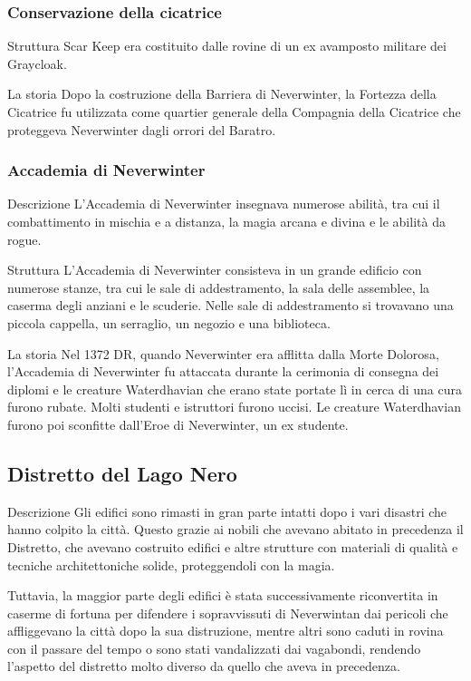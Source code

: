 \documentclass{article}
\begin{document}
              \subsubsection{Conservazione della cicatrice}
Struttura
Scar Keep era costituito dalle rovine di un ex avamposto militare dei Graycloak.

La storia
Dopo la costruzione della Barriera di Neverwinter, la Fortezza della Cicatrice fu utilizzata come quartier generale della Compagnia della Cicatrice che proteggeva Neverwinter dagli orrori del Baratro.
              \subsubsection{Accademia di Neverwinter}
Descrizione
L'Accademia di Neverwinter insegnava numerose abilità, tra cui il combattimento in mischia e a distanza, la magia arcana e divina e le abilità da rogue.

Struttura
L'Accademia di Neverwinter consisteva in un grande edificio con numerose stanze, tra cui le sale di addestramento, la sala delle assemblee, la caserma degli anziani e le scuderie. Nelle sale di addestramento si trovavano una piccola cappella, un serraglio, un negozio e una biblioteca.

La storia
Nel 1372 DR, quando Neverwinter era afflitta dalla Morte Dolorosa, l'Accademia di Neverwinter fu attaccata durante la cerimonia di consegna dei diplomi e le creature Waterdhavian che erano state portate lì in cerca di una cura furono rubate. Molti studenti e istruttori furono uccisi. Le creature Waterdhavian furono poi sconfitte dall'Eroe di Neverwinter, un ex studente.
          \subsection{Distretto del Lago Nero}
Descrizione
Gli edifici sono rimasti in gran parte intatti dopo i vari disastri che hanno colpito la città. Questo grazie ai nobili che avevano abitato in precedenza il Distretto, che avevano costruito edifici e altre strutture con materiali di qualità e tecniche architettoniche solide, proteggendoli con la magia.

Tuttavia, la maggior parte degli edifici è stata successivamente riconvertita in caserme di fortuna per difendere i sopravvissuti di Neverwintan dai pericoli che affliggevano la città dopo la sua distruzione, mentre altri sono caduti in rovina con il passare del tempo o sono stati vandalizzati dai vagabondi, rendendo l'aspetto del distretto molto diverso da quello che aveva in precedenza.
\end{document}
